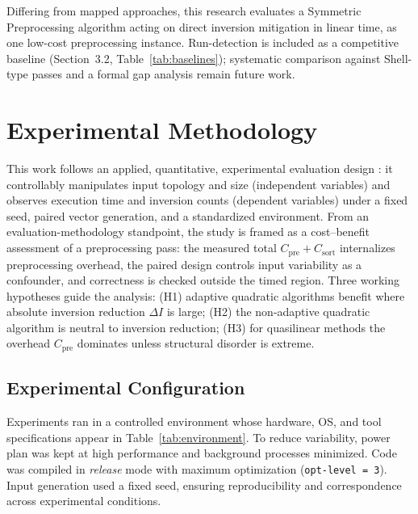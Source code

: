 \documentclass[namedate,webpdf,contemporary,large]{TBench-template}%
\theoremstyle{thmstyleone}%
\theoremstyle{thmstyletwo}%
\theoremstyle{thmstylethree}%
\begin{document}
Differing from mapped approaches, this research evaluates a Symmetric Preprocessing algorithm acting on direct inversion mitigation in linear time, as one low-cost preprocessing instance. Run-detection is included as a competitive baseline (Section~3.2, Table~\ref{tab:baselines}); systematic comparison against Shell-type passes and a formal gap analysis remain future work.

\section{Experimental Methodology}\label{sec:method}
This work follows an applied, quantitative, experimental evaluation design \cite{gil_metodos_2019,sampieri_metodologia_2021}: it controllably manipulates input topology and size (independent variables) and observes execution time and inversion counts (dependent variables) under a fixed seed, paired vector generation, and a standardized environment. From an evaluation-methodology standpoint, the study is framed as a cost--benefit assessment of a preprocessing pass: the measured total $C_{\text{pre}}+C_{\text{sort}}$ internalizes preprocessing overhead, the paired design controls input variability as a confounder, and correctness is checked outside the timed region. Three working hypotheses guide the analysis: (H1) adaptive quadratic algorithms benefit where absolute inversion reduction $\Delta I$ is large; (H2) the non-adaptive quadratic algorithm is neutral to inversion reduction; (H3) for quasilinear methods the overhead $C_{\text{pre}}$ dominates unless structural disorder is extreme.

\subsection{Experimental Configuration}
Experiments ran in a controlled environment whose hardware, OS, and tool specifications appear in Table~\ref{tab:environment}. To reduce variability, power plan was kept at high performance and background processes minimized. Code was compiled in \emph{release} mode with maximum optimization (\texttt{opt-level = 3}). Input generation used a fixed seed, ensuring reproducibility and correspondence across experimental conditions.

\end{document}
